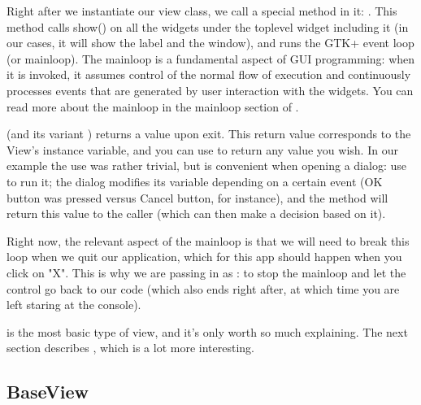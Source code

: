 \documentclass[a4paper]{howto}
\begin{document}
Right after we instantiate our view class, we call a special method in
it: . This method calls show() on all the
widgets under the toplevel widget including it (in our cases, it will
show the label and the window), and runs the GTK+ event loop (or
mainloop). The mainloop is a fundamental aspect of GUI programming: when
it is invoked, it assumes control of the normal flow of execution and
continuously processes events that are generated by user interaction
with the widgets. You can read more about the mainloop in the mainloop
section of
.

 (and its variant )
returns a value upon exit. This return value corresponds to the View's
 instance variable, and you can use  to
return any value you wish. In our example the use was rather trivial,
but  is convenient when opening a dialog: use
 to run it; the dialog modifies its
 variable depending on a certain event (OK button was
pressed versus Cancel button, for instance), and the method will return
this value to the caller (which can then make a decision based on it).

Right now, the relevant aspect of the mainloop is that we will need to
break this loop when we quit our application, which for this app should
happen when you click on "X". This is why we are passing in
 as : to stop the mainloop and
let the control go back to our code (which also ends right after, at
which time you are left staring at the console).

 is the most basic type of view, and it's only worth so
much explaining. The next section describes , which is
a lot more interesting.

\subsection{BaseView}
\end{document}
